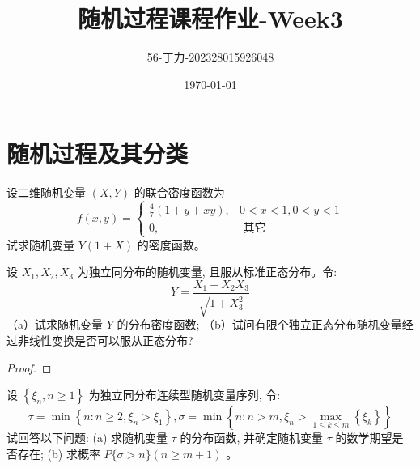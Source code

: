 \documentclass[a4,10pt]{ctexart}
\begin{document}
\title{随机过程课程作业-\textbf{Week3}}
\author{56-丁力-202328015926048}
\date{\today}
\maketitle
\tableofcontents
\newpage
{}
\newpage

\section{随机过程及其分类}

\begin{ti}{5}{}

    设二维随机变量 $(X, Y)$ 的联合密度函数为
    $$
    f(x, y)=\left\{\begin{array}{lc}
    \frac{4}{7}(1+y+x y), & 0<x<1,0<y<1 \\
    0, & \text { 其它 }
    \end{array}\right.
    $$
    试求随机变量 $Y(1+X)$ 的密度函数。
\end{ti}
    \begin{qj}
    

\end{qj}

   
    
    \begin{ti}{6}{}

        设 $X_1, X_2 , X_3$ 为独立同分布的随机变量, 且服从标准正态分布。令:
        $$
        Y=\frac{X_1+X_2 X_3}{\sqrt{1+X_3^2}}
        $$
        （a）试求随机变量 $Y$ 的分布密度函数;
        （b）试问有限个独立正态分布随机变量经过非线性变换是否可以服从正态分布?
    
\end{ti}
    \begin{proof}

    \end{proof}
  
    \begin{ti}{7}{}

       设 $\left\{\xi_n, n \geq 1\right\}$ 为独立同分布连续型随机变量序列, 令:
        $$
        \tau=\min \left\{n: n \geq 2, \xi_n>\xi_1\right\}, \sigma=\min \left\{n: n>m, \xi_n>\max _{1 \leq k \leq m}\left\{\xi_k\right\}\right\}
        $$
        试回答以下问题:
        (a) 求随机变量 $\tau$ 的分布函数, 并确定随机变量 $\tau$ 的数学期望是否存在;
        (b) 求概率 $P\{\sigma>n\}(n \geq m+1)$ 。
        

\end{ti}
\end{document}
